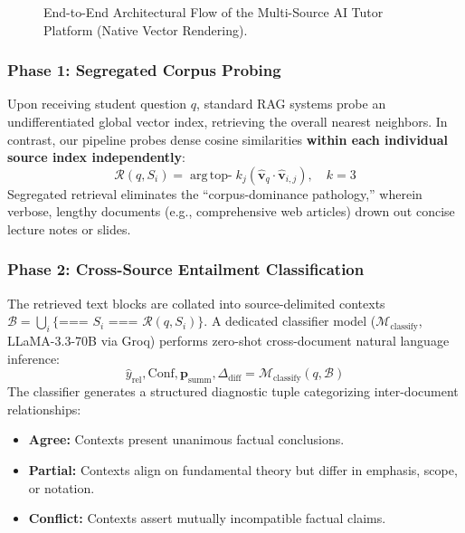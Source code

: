 \documentclass[conference]{IEEEtran}
\begin{document}
\begin{figure}[t]
{
}
\caption{End-to-End Architectural Flow of the Multi-Source AI Tutor Platform (Native Vector Rendering).}
\label{fig:methodology}
\end{figure}

\subsubsection{Phase 1: Segregated Corpus Probing}
Upon receiving student question $q$, standard RAG systems probe an undifferentiated global vector index, retrieving the overall nearest neighbors. In contrast, our pipeline probes dense cosine similarities \textbf{within each individual source index independently}:
\begin{equation}
\mathcal{R}(q, S_i) = \operatorname{arg\,top-}k_{j} \left( \mathbf{\hat{v}}_q \cdot \mathbf{\hat{v}}_{i,j} \right), \quad k=3
\end{equation}
Segregated retrieval eliminates the ``corpus-dominance pathology,'' wherein verbose, lengthy documents (e.g., comprehensive web articles) drown out concise lecture notes or slides.

\subsubsection{Phase 2: Cross-Source Entailment Classification}
The retrieved text blocks are collated into source-delimited contexts $\mathcal{B} = \bigcup_{i} \{ \text{=== } S_i \text{ === } \mathcal{R}(q, S_i) \}$. A dedicated classifier model ($\mathcal{M}_{\text{classify}}$, LLaMA-3.3-70B via Groq) performs zero-shot cross-document natural language inference:
\begin{equation}
\hat{y}_{\text{rel}}, \text{Conf}, \mathbf{p}_{\text{summ}}, \Delta_{\text{diff}} = \mathcal{M}_{\text{classify}}(q, \mathcal{B})
\end{equation}
The classifier generates a structured diagnostic tuple categorizing inter-document relationships:
\begin{itemize}
    \item \textbf{Agree:} Contexts present unanimous factual conclusions.
    \item \textbf{Partial:} Contexts align on fundamental theory but differ in emphasis, scope, or notation.
    \item \textbf{Conflict:} Contexts assert mutually incompatible factual claims.
\end{itemize}
\end{document}
